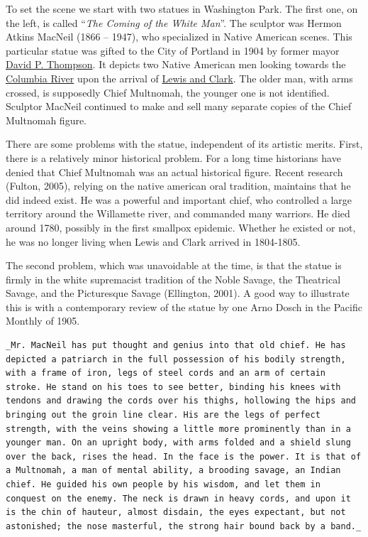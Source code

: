 \documentclass[
  12pt,
]{book}
\begin{document}
To set the scene we start with two statues in Washington Park. The first one, on the left, is called ``\emph{The Coming of the White Man}''. The sculptor was Hermon Atkins MacNeil (1866 -- 1947), who specialized in Native American scenes. This particular statue was gifted to the City of Portland in 1904 by former mayor \href{https://en.wikipedia.org/wiki/David_P._Thompson}{David P. Thompson}. It depicts two Native American men looking towards the \href{https://en.wikipedia.org/wiki/Columbia_River}{Columbia River} upon the arrival of \href{https://en.wikipedia.org/wiki/Lewis_and_Clark_Expedition}{Lewis and Clark}. The older man, with arms crossed, is supposedly Chief Multnomah, the younger one is not identified. Sculptor MacNeil continued to make and sell many separate copies of the Chief Multnomah figure.

There are some problems with the statue, independent of its artistic merits. First, there is a relatively minor historical problem. For a long time historians have denied that Chief Multnomah was an actual historical figure. Recent research (Fulton, 2005), relying on the native american oral tradition, maintains that he did indeed exist. He was a powerful and important chief, who controlled a large territory around the Willamette river, and commanded many warriors. He died around 1780, possibly in the first smallpox epidemic. Whether he existed or not, he was no longer living when Lewis and Clark arrived in 1804-1805.

The second problem, which was unavoidable at the time, is that the statue is firmly in the white supremacist tradition of the Noble Savage, the Theatrical Savage, and the Picturesque Savage (Ellington, 2001). A good way to illustrate this is with a contemporary review of the statue by one Arno Dosch in the Pacific Monthly of 1905.

\begin{verbatim}
_Mr. MacNeil has put thought and genius into that old chief. He has depicted a patriarch in the full possession of his bodily strength, with a frame of iron, legs of steel cords and an arm of certain stroke. He stand on his toes to see better, binding his knees with tendons and drawing the cords over his thighs, hollowing the hips and bringing out the groin line clear. His are the legs of perfect strength, with the veins showing a little more prominently than in a younger man. On an upright body, with arms folded and a shield slung over the back, rises the head. In the face is the power. It is that of a Multnomah, a man of mental ability, a brooding savage, an Indian chief. He guided his own people by his wisdom, and let them in conquest on the enemy. The neck is drawn in heavy cords, and upon it is the chin of hauteur, almost disdain, the eyes expectant, but not astonished; the nose masterful, the strong hair bound back by a band._
\end{verbatim}
\end{document}
